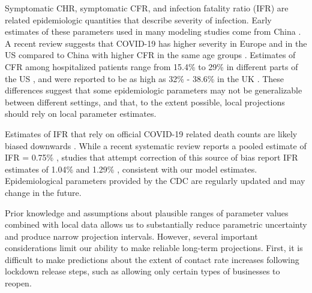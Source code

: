 \documentclass[11pt]{article}
\begin{document}
Symptomatic CHR, symptomatic CFR, and infection fatality ratio (IFR) are related epidemiologic quantities that describe severity of infection. Early estimates of these parameters used in many modeling studies come from China \citep{verity2020estimates, wu2020estimating, bi2020epidemiology}.
A recent review suggests that COVID-19 has higher severity in Europe and in the US compared to China \citep{lane2020country} with higher CFR in the same age groups \citep{onder2020case}. Estimates of CFR among hospitalized patients range from 15.4\% to 29\% in different parts of the US \citep{lewnard2020incidence, paranjpe2020clinical, lane2020country}, and were reported to be as high as 32\% - 38.6\% in the UK \citep{perez2020clinical, docherty2020features}. These differences suggest that some epidemiologic parameters may not be generalizable between different settings, and that, to the extent possible, local projections should rely on local parameter estimates.

Estimates of IFR that rely on official COVID-19 related death counts are likely biased downwards \citep{weinberger2020estimating}. While a recent systematic review reports a pooled estimate of IFR = 0.75\% \citep{meyerowitz2020systematic}, studies that attempt correction of this source of bias report IFR estimates of 1.04\% \citep{grewelle2020estimating} and 1.29\% \citep{rinaldi2020empirical}, consistent with our model estimates. Epidemiological parameters provided by the CDC are regularly updated and may change in the future.

Prior knowledge and assumptions about plausible ranges of parameter values combined with local data allows us to substantially reduce parametric uncertainty and produce narrow projection intervals. However, several important considerations limit our ability to make reliable long-term projections. 
First, it is difficult to make predictions about the extent of contact rate increases following lockdown release steps, such as allowing only certain types of businesses to reopen. 
\end{document}
